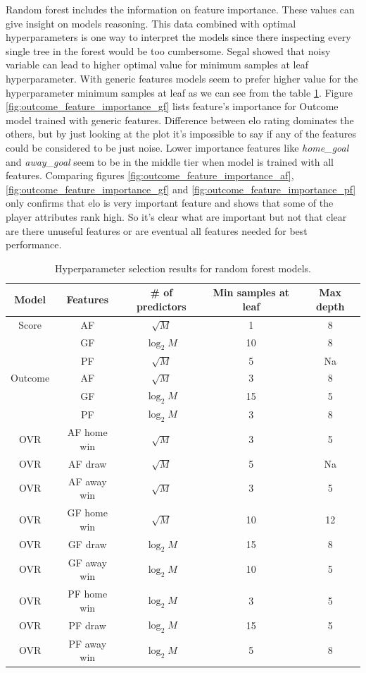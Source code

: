 Random forest includes the information on feature importance. These values can give insight on models reasoning. This data combined with optimal hyperparameters is one way to interpret the models since there inspecting every single tree in the forest would be too cumbersome. Segal \cite{segal2004machine} showed that noisy variable can lead to higher optimal value for minimum samples at leaf hyperparameter. With generic features models seem to prefer higher value for the hyperparameter minimum samples at leaf as we can see from the table \ref{table:hyperparam_results}. Figure \ref{fig:outcome_feature_importance_gf} lists feature's importance for Outcome model trained with generic features. Difference between elo rating dominates the others, but by just looking at the plot it's impossible to say if any of the features could be considered to be just noise. Lower importance features like \textit{home_goal} and \textit{away_goal} seem to be in the middle tier when model is trained with all features. Comparing figures \ref{fig:outcome_feature_importance_af}, \ref{fig:outcome_feature_importance_gf} and \ref{fig:outcome_feature_importance_pf} only confirms that elo is very important feature and shows that some of the player attributes rank high. So it's clear what are important but not that clear are there unuseful features or are eventual all features needed for best performance.

\begin{table}
    \caption{Hyperparameter selection results for random forest models.}
    \begin{tabular}{| c  c| c| c| c|}
        \hline
        Model & Features & \# of predictors & Min samples at leaf & Max depth\\
        \hline
        Score & AF & $\sqrt{M}$ & 1 & 8 \\
         & GF & $\log_2{M}$ & 10 & 8 \\
         & PF & $\sqrt{M}$ & 5 & Na \\
         \hline
        Outcome & AF & $\sqrt{M}$ & 3 & 8 \\
         & GF & $\log_2{M}$ & 15 & 5 \\
         & PF & $\log_2{M}$ & 3 & 8 \\
        \hline
        OVR & AF home win & $\sqrt{M}$ & 3 & 5 \\
        OVR & AF draw & $\sqrt{M}$ & 5 & Na \\
        OVR & AF away win & $\sqrt{M}$ & 3 & 5 \\
        OVR & GF home win & $\sqrt{M}$ & 10 & 12 \\
        OVR & GF draw & $\log_2{M}$ & 15 & 8 \\
        OVR & GF away win & $\log_2{M}$ & 10 & 5 \\
        OVR & PF home win & $\log_2{M}$ & 3 & 5 \\
        OVR & PF draw & $\log_2{M}$ & 15 & 5 \\
        OVR & PF away win & $\log_2{M}$ & 5 & 8 \\
        \hline
    \end{tabular}
    \label{table:hyperparam_results}
\end{table}

